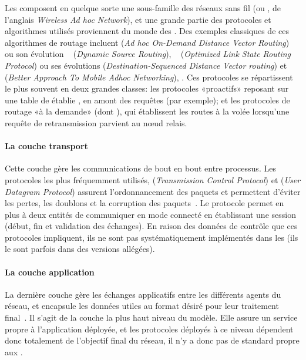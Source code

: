 Les \rcsfs composent en quelque sorte une sous-famille des réseaux sans fil \adhoc (ou \wanet, de l'anglais \textit{Wireless Ad hoc Network}), et une grande partie des protocoles et algorithmes utilisés proviennent du monde des \wanet.
Des exemples classiques de ces algorithmes de routage incluent \aodv (\textit{Ad hoc On-Demand Distance Vector Routing})~\cite{aodv} ou son évolution \dsr~\cite{dsr} (\textit{Dynamic Source Routing}), \olsr~\cite{olsr} (\textit{Optimized Link State Routing Protocol}) ou ses évolutions \dsdv (\textit{Destination-Sequenced Distance Vector routing}) et \batman (\textit{Better Approach To Mobile Adhoc Networking}), \etc.
Ces protocoles se répartissent le plus souvent en deux grandes classes: les protocoles «proactifs» reposant sur une table de  établie \apriori, en amont des requêtes (\aodv par exemple); et les protocoles de routage «à la demande» (dont \olsr), qui établissent les routes à la volée lorsqu'une requête de retransmission parvient au nœud relais.

            \paragraph{La couche transport}
Cette couche gère les communications de bout en bout entre processus.
Les protocoles les plus fréquemment utilisés, \tcp (\textit{Transmission Control Protocol}) et \udp (\textit{User Datagram Protocol}) assurent l'ordonnancement des paquets et permettent d'éviter les pertes, les doublons et la corruption des paquets~\cite{TW10}.
Le protocole \tcp permet en plus à deux entités de communiquer en mode connecté en établissant une session (début, fin et validation des échanges).
En raison des données de contrôle que ces protocoles impliquent, ils ne sont pas systématiquement implémentés dans les \rcs (ils le sont parfois dans des versions allégées).

            \paragraph{La couche application}
La dernière couche gère les échanges applicatifs entre les différents agents du réseau, et encapsule les données utiles au format désiré pour leur traitement final~\cite{TW10}.
Il s'agit de la couche la plus haut niveau  du modèle.
Elle assure un service propre à l'application déployée, et les protocoles déployés à ce niveau dépendent donc totalement de l'objectif final du réseau, il n'y a donc pas de standard propre aux \rcs.


